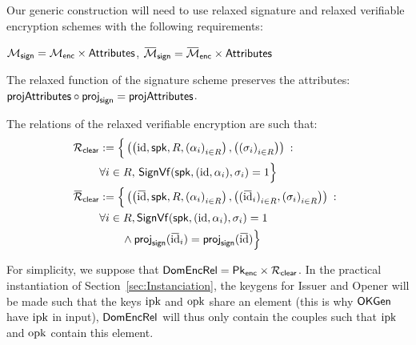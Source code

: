 \label{sec:general_AC}
Our generic construction will need to use relaxed signature and relaxed verifiable encryption schemes
with the following requirements:
\begin{compactitem}
	\item $\mathcal{M}_{\mathsf{sign}} = \mathcal{M}_{\mathsf{enc}} \times \mathsf{Attributes}$, $\SetRelMessSign = \SetRelMessEnc \times \SetAttrAC$
	\item The relaxed function of the signature scheme preserves the attributes: $\proj{\SetAttrAC} \circ \projsign = \proj{\SetAttrAC}$.
	\item The relations of the relaxed verifiable encryption are such that:
		  \begin{align*}
\relationclear    & := \Big\{\left(\left(\identity, \spk, R, 
{(\alpha_i)}_{i \in R}\right),\left({(\sigma_i)}_{i \in R}\right)\right)\::\:
\hspace{0.1cm} \\ &\forall i \in R,\, \SignVf(\spk, (\identity,\alpha_i),
\signature_i) = 1 \Big\}                                                                                                                   \\ \barrelationclear & := \Big\{\left(\left(\baridentity, \spk, R, {(\alpha_i)}_{i \in R}\right),
\left({(\baridentity_i)}_{i \in R}, {(\signature_i)}_{i \in R}\right)\right)\::\:
\hspace{0.1cm} \\ &\forall i \in R, 
\SignVf(\spk, (\identity,\alpha_i), \signature_i) = 1 \\
& \hspace{7mm}\wedge \projsign(\baridentity_i) = \projsign(\baridentity) \Big\}
      \end{align*}
      \normalsize
	\item For simplicity, we suppose that  $\mathsf{DomEncRel} = \mathsf{Pk}_{\mathsf{enc}}
		\times \mathcal{R}_{\mathsf{clear}}$. In the
		practical instantiation of Section~\ref{sec:Instanciation}, the keygens for Issuer and
		Opener will be made such that the keys $\text{ipk}$ and $\text{opk}$ share an element (this is why
		 $\mathsf{OKGen}$ have $\text{ipk}$ in input),
		$\mathsf{DomEncRel}$ will thus only contain the couples such that $\text{ipk}$ and $\text{opk}$ contain this element.
\end{compactitem}

